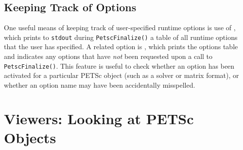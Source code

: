 {{{\subsection{Keeping Track of Options}

One useful means of keeping track of user-specified runtime options is
use of , which prints to \lstinline{stdout} during \lstinline{PetscFinalize()}
 a table of all runtime options that the user has
specified.   A related option is ,
 which prints the options table and indicates
any options that have {\em not} been requested upon a call to \lstinline{PetscFinalize()}.  This feature is useful to check whether an option
has been activated for a particular PETSc object (such as a solver or
matrix format), or whether an option name may have been accidentally
misspelled.

\section{Viewers: Looking at PETSc Objects} \label{sec_viewers}

}}}

